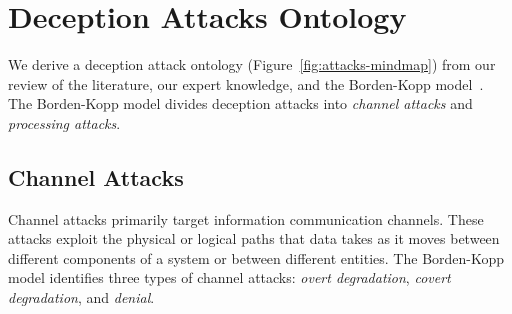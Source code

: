 \section{\MR Deception Attacks Ontology}
\label{sec:decattacks}

We derive a \MR deception attack ontology (Figure~\ref{fig:attacks-mindmap}) from our review of the literature, our expert knowledge, and the Borden-Kopp model~\cite{borden1999information,kopp2000information,brumley:2012}.  
The Borden-Kopp model divides deception attacks into \textit{channel attacks} and \textit{processing attacks}. 



\subsection{Channel Attacks}
Channel attacks primarily target information communication channels. 
These attacks exploit the physical or logical paths that data takes as it moves between different components of a system or between different entities. 
The Borden-Kopp model identifies three types of channel attacks: \textit{overt degradation}, \textit{covert degradation}, and \textit{denial}.

